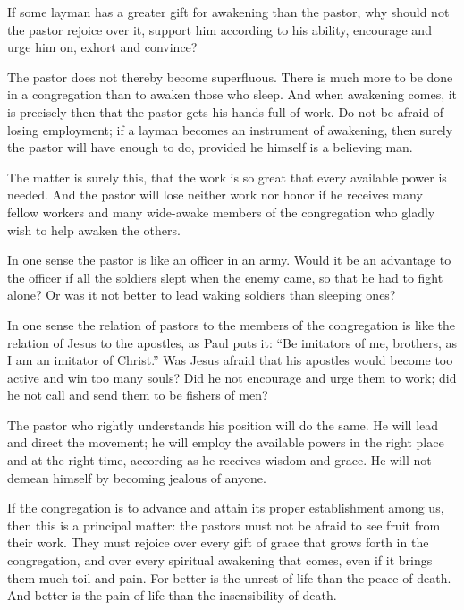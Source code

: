 If some layman has a greater gift for awakening than the pastor, why should not the pastor rejoice over it, support him according to his ability, encourage and urge him on, exhort and convince?

The pastor does not thereby become superfluous. There is much more to be done in a congregation than to awaken those who sleep. And when awakening comes, it is precisely then that the pastor gets his hands full of work. Do not be afraid of losing employment; if a layman becomes an instrument of awakening, then surely the pastor will have enough to do, provided he himself is a believing man.

The matter is surely this, that the work is so great that every available power is needed. And the pastor will lose neither work nor honor if he receives many fellow workers and many wide-awake members of the congregation who gladly wish to help awaken the others.

In one sense the pastor is like an officer in an army. Would it be an advantage to the officer if all the soldiers slept when the enemy came, so that he had to fight alone? Or was it not better to lead waking soldiers than sleeping ones?

In one sense the relation of pastors to the members of the congregation is like the relation of Jesus to the apostles, as Paul puts it: “Be imitators of me, brothers, as I am an imitator of Christ.” Was Jesus afraid that his apostles would become too active and win too many souls? Did he not encourage and urge them to work; did he not call and send them to be fishers of men?

The pastor who rightly understands his position will do the same. He will lead and direct the movement; he will employ the available powers in the right place and at the right time, according as he receives wisdom and grace. He will not demean himself by becoming jealous of anyone.

If the congregation is to advance and attain its proper establishment among us, then this is a principal matter: the pastors must not be afraid to see fruit from their work. They must rejoice over every gift of grace that grows forth in the congregation, and over every spiritual awakening that comes, even if it brings them much toil and pain. For better is the unrest of life than the peace of death. And better is the pain of life than the insensibility of death.

